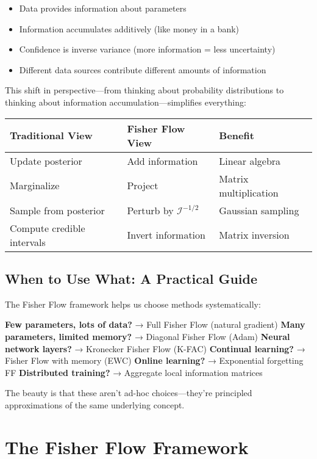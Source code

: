 \documentclass[11pt]{article}
\begin{document}
\begin{itemize}
\item Data provides information about parameters
\item Information accumulates additively (like money in a bank)
\item Confidence is inverse variance (more information = less uncertainty)
\item Different data sources contribute different amounts of information
\end{itemize}

This shift in perspective—from thinking about probability distributions to thinking about information accumulation—simplifies everything:

\begin{center}
\begin{tabular}{lll}
\toprule
\textbf{Traditional View} & \textbf{Fisher Flow View} & \textbf{Benefit} \\
\midrule
Update posterior & Add information & Linear algebra \\
Marginalize & Project & Matrix multiplication \\
Sample from posterior & Perturb by $\mathcal{I}^{-1/2}$ & Gaussian sampling \\
Compute credible intervals & Invert information & Matrix inversion \\
\bottomrule
\end{tabular}
\end{center}

\subsection{When to Use What: A Practical Guide}

The Fisher Flow framework helps us choose methods systematically:

\textbf{Few parameters, lots of data?} → Full Fisher Flow (natural gradient)
\textbf{Many parameters, limited memory?} → Diagonal Fisher Flow (Adam)
\textbf{Neural network layers?} → Kronecker Fisher Flow (K-FAC)
\textbf{Continual learning?} → Fisher Flow with memory (EWC)
\textbf{Online learning?} → Exponential forgetting FF
\textbf{Distributed training?} → Aggregate local information matrices

The beauty is that these aren't ad-hoc choices—they're principled approximations of the same underlying concept.

\section{The Fisher Flow Framework}
\end{document}
